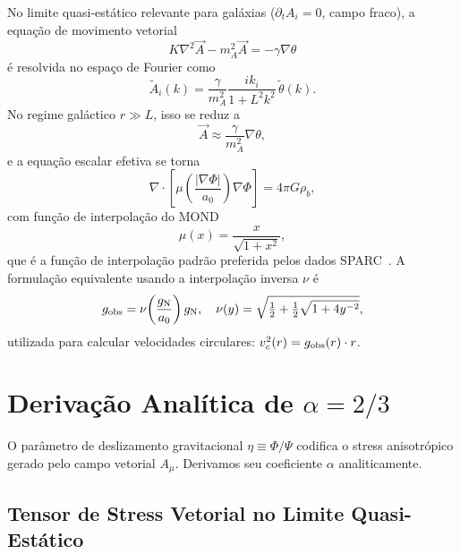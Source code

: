 \documentclass[aps,prd,twocolumn,showpacs,superscriptaddress]{revtex4-2}
\newcommand{\aO}{a_0}
\newcommand{\gN}{g_{\rm N}}
\newcommand{\gobs}{g_{\rm obs}}
\begin{document}
No limite quasi-estático relevante para galáxias
($\partial_t A_i = 0$, campo fraco), a equação de movimento
vetorial
\begin{equation}
  K\nabla^2 \vec{A} - m_A^2\vec{A} = -\gamma\nabla\theta
\end{equation}
é resolvida no espaço de Fourier como
\begin{equation}
  \tilde{A}_i(k) = \frac{\gamma}{m_A^2}
    \frac{ik_i}{1+L^2 k^2}\,\tilde\theta(k).
\end{equation}
No regime galáctico $r \gg L$, isso se reduz a
\begin{equation}
  \vec{A} \approx \frac{\gamma}{m_A^2}\nabla\theta,
  \label{eq:Alocal}
\end{equation}
e a equação escalar efetiva se torna
\begin{equation}
  \nabla\cdot\!\left[\mu\!\left(\frac{|\nabla\Phi|}{\aO}\right)\nabla\Phi\right]
  = 4\pi G\rho_b,
  \label{eq:MONDeq}
\end{equation}
com função de interpolação do MOND
\begin{equation}
  \boxed{\mu(x) = \frac{x}{\sqrt{1+x^2}},}
  \label{eq:mu}
\end{equation}
que é a função de interpolação padrão preferida pelos dados
SPARC~\cite{Lelli2017}.
A formulação equivalente usando a interpolação inversa $\nu$ é
\begin{equation}
  \gobs = \nu\!\left(\frac{\gN}{\aO}\right)\gN,
  \quad
  \nu(y) = \sqrt{\tfrac{1}{2}+\tfrac{1}{2}\sqrt{1+4y^{-2}}},
  \label{eq:nu}
\end{equation}
utilizada para calcular velocidades circulares:
$v_c^2(r) = \gobs(r)\cdot r$.

\section{Derivação Analítica de \texorpdfstring{$\alpha=2/3$}{alfa=2/3}}
\label{sec:alpha}

O parâmetro de deslizamento gravitacional $\eta \equiv \Phi/\Psi$
codifica o stress anisotrópico gerado pelo campo vetorial $A_\mu$.
Derivamos seu coeficiente $\alpha$ analiticamente.

\subsection{Tensor de Stress Vetorial no Limite Quasi-Estático}
\end{document}
